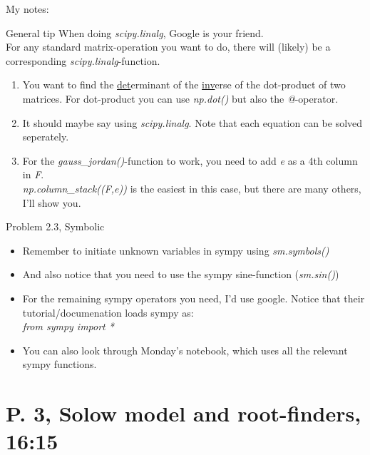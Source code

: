 \documentclass[10pt,danish,t,10pt]{beamer}
\newcommand{\code}[1]{\textit{#1}} %
\begin{document}
\begin{frame}{My notes:}
    \begin{alertblock}{General tip}
    When doing \code{scipy.linalg}, Google is your friend. \\
    For any standard matrix-operation you want to do, there will (likely) be a corresponding \code{scipy.linalg}-function.
    
    \end{alertblock}
    \begin{enumerate}
        \item[2.1, A:] You want to find the \underline{det}erminant of the \underline{inv}erse of the dot-product of two matrices. For dot-product you can use \code{np.dot()} but also the \code{@}-operator.
        \item[2.1, B:] It should maybe say using \code{scipy.linalg}. Note that each equation can be solved seperately.
        \item[2.2:] For the \code{gauss\_jordan()}-function to work, you need to add \code{e} as a 4th column in \code{F}. \\ 
        \code{np.column\_stack((F,e))} is the easiest in this case, but there are many others, I'll show you.
    \end{enumerate}

\end{frame}
\begin{frame}{Problem 2.3, Symbolic}
\begin{itemize}
    \item Remember to initiate unknown variables in sympy using \code{sm.symbols()}
    \item And also notice that you need to use the sympy sine-function (\code{sm.sin()})
    \item For the remaining sympy operators you need, I'd use google. Notice that their tutorial/documenation loads sympy as:\\
    \code{from sympy import *}
    \item You can also look through Monday's notebook, which uses all the relevant sympy functions.
\end{itemize}
\end{frame}


\section{P. 3, Solow model and root-finders, 16:15}
\end{document}
